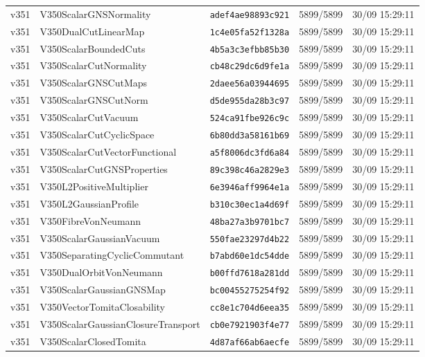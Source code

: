 \documentclass[11pt]{article}
\theoremstyle{definition}\newtheorem{deriv}{Derivação}
\begin{document}
{\begin{longtable}{@{}lllll@{}}
v351 & V350ScalarGNSNormality & \texttt{adef4ae98893c921} & 5899/5899 & 30/09 15:29:11 \\
v351 & V350DualCutLinearMap & \texttt{1c4e05fa52f1328a} & 5899/5899 & 30/09 15:29:11 \\
v351 & V350ScalarBoundedCuts & \texttt{4b5a3c3efbb85b30} & 5899/5899 & 30/09 15:29:11 \\
v351 & V350ScalarCutNormality & \texttt{cb48c29dc6d9fe1a} & 5899/5899 & 30/09 15:29:11 \\
v351 & V350ScalarGNSCutMaps & \texttt{2daee56a03944695} & 5899/5899 & 30/09 15:29:11 \\
v351 & V350ScalarGNSCutNorm & \texttt{d5de955da28b3c97} & 5899/5899 & 30/09 15:29:11 \\
v351 & V350ScalarCutVacuum & \texttt{524ca91fbe926c9c} & 5899/5899 & 30/09 15:29:11 \\
v351 & V350ScalarCutCyclicSpace & \texttt{6b80dd3a58161b69} & 5899/5899 & 30/09 15:29:11 \\
v351 & V350ScalarCutVectorFunctional & \texttt{a5f8006dc3fd6a84} & 5899/5899 & 30/09 15:29:11 \\
v351 & V350ScalarCutGNSProperties & \texttt{89c398c46a2829e3} & 5899/5899 & 30/09 15:29:11 \\
v351 & V350L2PositiveMultiplier & \texttt{6e3946aff9964e1a} & 5899/5899 & 30/09 15:29:11 \\
v351 & V350L2GaussianProfile & \texttt{b310c30ec1a4d69f} & 5899/5899 & 30/09 15:29:11 \\
v351 & V350FibreVonNeumann & \texttt{48ba27a3b9701bc7} & 5899/5899 & 30/09 15:29:11 \\
v351 & V350ScalarGaussianVacuum & \texttt{550fae23297d4b22} & 5899/5899 & 30/09 15:29:11 \\
v351 & V350SeparatingCyclicCommutant & \texttt{b7abd60e1dc54dde} & 5899/5899 & 30/09 15:29:11 \\
v351 & V350DualOrbitVonNeumann & \texttt{b00ffd7618a281dd} & 5899/5899 & 30/09 15:29:11 \\
v351 & V350ScalarGaussianGNSMap & \texttt{bc00455275254f92} & 5899/5899 & 30/09 15:29:11 \\
v351 & V350VectorTomitaClosability & \texttt{cc8e1c704d6eea35} & 5899/5899 & 30/09 15:29:11 \\
v351 & V350ScalarGaussianClosureTransport & \texttt{cb0e7921903f4e77} & 5899/5899 & 30/09 15:29:11 \\
v351 & V350ScalarClosedTomita & \texttt{4d87af66ab6aecfe} & 5899/5899 & 30/09 15:29:11 \\

\end{longtable}}
\end{document}
